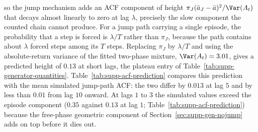 so the jump mechanism adds an ACF component of height $\pi_J (\bar a_J
- \bar a)^2 / \Var(A_t)$ that decays almost linearly to zero at lag
$\lambda$, precisely the slow component the counted chain cannot
produce. For a jump path carrying a single episode, the probability
that a step is forced is $\lambda / T$ rather than $\pi_J$, because
the path contains about $\lambda$ forced steps among its $T$ steps.
Replacing $\pi_J$ by $\lambda / T$ and using the absolute-return
variance of the fitted two-phase mixture, $\Var(A_t) = 3.01$, gives a predicted height
of $0.13$ at short lags, the plateau entry of
Table~\ref{tab:supp-generator-quantities}.
Table~\ref{tab:supp-acf-prediction} compares
this prediction with the mean simulated jump-path ACF: the two differ
by $0.013$ at lag $5$ and by less than $0.01$ from lag $10$ onward. At lags $1$ to $3$ the
simulated values exceed the episode component ($0.35$ against $0.13$
at lag $1$; Table~\ref{tab:supp-acf-prediction}) because the free-phase geometric component of
Section~\ref{sec:supp-gen-nojump} adds on top before it dies out.

\begin{table}[tbp]
\centering
\caption{\textbf{Episode-overlap prediction of the jump-path
    absolute-return autocorrelation function (ACF) against
    simulation.} The prediction evaluates
    Eq.~\eqref{eq:supp-acf-wj} at the fitted SPY values with the
    single-episode forced fraction $\lambda/T$ in place of $\pi_J$
    and the same-episode probability $h(\tau)$ of
    Eq.~\eqref{eq:supp-h}. The simulated column is the mean ACF of
    $|G_t|$ over the $99$ jump-active paths among $400$ simulated
    in-sample-length paths. The free-phase component of
    Eq.~\eqref{eq:supp-acf-nj} is excluded from the prediction; it
    has decayed below $0.01$ from lag $5$ onward.}
\label{tab:supp-acf-prediction}
\small

\end{table}

